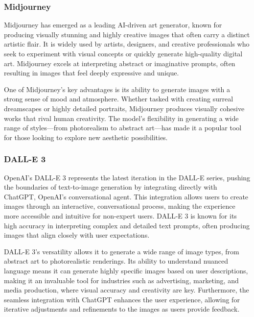 \subsubsection{Midjourney}

Midjourney \cite{Midjourney} has emerged as a leading AI-driven art generator, known for producing visually stunning and highly creative images that often carry a distinct artistic flair. It is widely used by artists, designers, and creative professionals who seek to experiment with visual concepts or quickly generate high-quality digital art. Midjourney excels at interpreting abstract or imaginative prompts, often resulting in images that feel deeply expressive and unique.

One of Midjourney's key advantages is its ability to generate images with a strong sense of mood and atmosphere. Whether tasked with creating surreal dreamscapes or highly detailed portraits, Midjourney produces visually cohesive works that rival human creativity. The model's flexibility in generating a wide range of styles—from photorealism to abstract art—has made it a popular tool for those looking to explore new aesthetic possibilities.

\subsubsection{DALL-E 3}

OpenAI's DALL-E 3 \cite{DALLE3} represents the latest iteration in the DALL-E series, pushing the boundaries of text-to-image generation by integrating directly with ChatGPT, OpenAI's conversational agent. This integration allows users to create images through an interactive, conversational process, making the experience more accessible and intuitive for non-expert users. DALL-E 3 is known for its high accuracy in interpreting complex and detailed text prompts, often producing images that align closely with user expectations.

DALL-E 3's versatility allows it to generate a wide range of image types, from abstract art to photorealistic renderings. Its ability to understand nuanced language means it can generate highly specific images based on user descriptions, making it an invaluable tool for industries such as advertising, marketing, and media production, where visual accuracy and creativity are key. Furthermore, the seamless integration with ChatGPT enhances the user experience, allowing for iterative adjustments and refinements to the images as users provide feedback.

